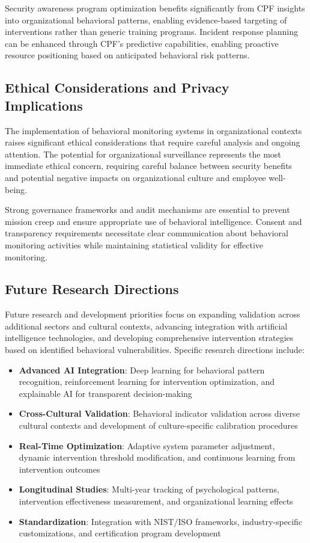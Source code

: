 \documentclass[journal]{IEEEtran}
\begin{document}
Security awareness program optimization benefits significantly from CPF insights into organizational behavioral patterns, enabling evidence-based targeting of interventions rather than generic training programs. Incident response planning can be enhanced through CPF's predictive capabilities, enabling proactive resource positioning based on anticipated behavioral risk patterns.

\subsection{Ethical Considerations and Privacy Implications}

The implementation of behavioral monitoring systems in organizational contexts raises significant ethical considerations that require careful analysis and ongoing attention. The potential for organizational surveillance represents the most immediate ethical concern, requiring careful balance between security benefits and potential negative impacts on organizational culture and employee well-being.

Strong governance frameworks and audit mechanisms are essential to prevent mission creep and ensure appropriate use of behavioral intelligence. Consent and transparency requirements necessitate clear communication about behavioral monitoring activities while maintaining statistical validity for effective monitoring.

\subsection{Future Research Directions}

Future research and development priorities focus on expanding validation across additional sectors and cultural contexts, advancing integration with artificial intelligence technologies, and developing comprehensive intervention strategies based on identified behavioral vulnerabilities. Specific research directions include:

\begin{itemize}
\item \textbf{Advanced AI Integration}: Deep learning for behavioral pattern recognition, reinforcement learning for intervention optimization, and explainable AI for transparent decision-making
\item \textbf{Cross-Cultural Validation}: Behavioral indicator validation across diverse cultural contexts and development of culture-specific calibration procedures  
\item \textbf{Real-Time Optimization}: Adaptive system parameter adjustment, dynamic intervention threshold modification, and continuous learning from intervention outcomes
\item \textbf{Longitudinal Studies}: Multi-year tracking of psychological patterns, intervention effectiveness measurement, and organizational learning effects
\item \textbf{Standardization}: Integration with NIST/ISO frameworks, industry-specific customizations, and certification program development
\end{itemize}
\end{document}
